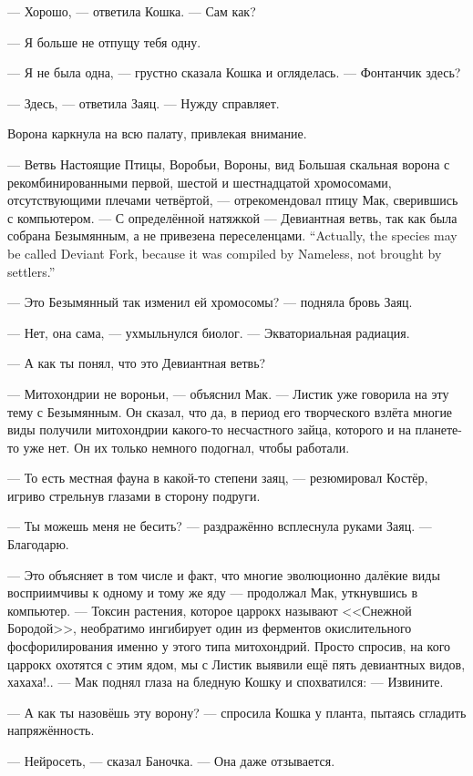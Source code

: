 --- Хорошо, --- ответила Кошка.
--- Сам как?

--- Я больше не отпущу тебя одну.

--- Я не была одна, --- грустно сказала Кошка и огляделась.
--- Фонтанчик здесь?

--- Здесь, --- ответила Заяц.
--- Нужду справляет.

Ворона каркнула на всю палату, привлекая внимание.

--- Ветвь Настоящие Птицы, Воробьи, Вороны, вид Большая скальная ворона с рекомбинированными первой, шестой и шестнадцатой хромосомами, отсутствующими плечами четвёртой, --- отрекомендовал птицу Мак, сверившись с компьютером.
{--- С определённой натяжкой --- Девиантная ветвь, так как была собрана Безымянным, а не привезена переселенцами.}
{``Actually, the species may be called Deviant Fork, because it was compiled by Nameless, not brought by settlers.''}

--- Это Безымянный так изменил ей хромосомы? --- подняла бровь Заяц.

--- Нет, она сама, --- ухмыльнулся биолог.
--- Экваториальная радиация.

--- А как ты понял, что это Девиантная ветвь?

--- Митохондрии не вороньи, --- объяснил Мак.
--- Листик уже говорила на эту тему с Безымянным.
Он сказал, что да, в период его творческого взлёта многие виды получили митохондрии какого-то несчастного зайца, которого и на планете-то уже нет.
Он их только немного подогнал, чтобы работали.

--- То есть местная фауна в какой-то степени заяц, --- резюмировал Костёр, игриво стрельнув глазами в сторону подруги.

--- Ты можешь меня не бесить? --- раздражённо всплеснула руками Заяц.
--- Благодарю.

--- Это объясняет в том числе и факт, что многие эволюционно далёкие виды восприимчивы к одному и тому же яду --- продолжал Мак, уткнувшись в компьютер.
--- Токсин растения, которое царрокх называют <<Снежной Бородой>>, необратимо ингибирует один из ферментов окислительного фосфорилирования именно у этого типа митохондрий.
Просто спросив, на кого царрокх охотятся с этим ядом, мы с Листик выявили ещё пять девиантных видов, хахаха!.. --- Мак поднял глаза на бледную Кошку и спохватился:
--- Извините.

--- А как ты назовёшь эту ворону? --- спросила Кошка у планта, пытаясь сгладить напряжённость.

--- Нейросеть, --- сказал Баночка.
--- Она даже отзывается.

